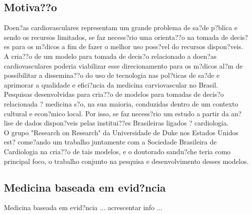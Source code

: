 \documentclass{article}
\begin{document}
\subsection{ \label{subsec:motivacao} Motiva??o}
Doen?as cardiovasculares representam um grande problema de sa?de p?blica e sendo os recursos limitados, se faz necess?rio uma orienta??o na tomada de decis?es para os m?dicos a fim de fazer o melhor uso poss?vel do recursos dispon?veis.\\ 
A cria??o de um modelo para tomada de decis?o relacionado a doen?as cardiovasculares poderia viabilizar esse direcionamento para os m?dicos al?m de possibilitar a dissemina??o do uso de tecnologia nas pol?ticas de sa?de e aprimorar a qualidade e efici?ncia da medicina carviovascular no Brasil.\\
Pesquisas desenvolvidas para cria??o de modelos para tomadas de decis?o relacionada ? medicina s?o, na sua maioria, conduzidas dentro de um contexto cultural e econ?mico local. Por isso, se faz necess?rio um estudo a partir da an?lise de dados dispon?veis pelas institui??es Brasileiras ligados ? cardiologia.\\
O grupo "Research on Research" da Universidade de Duke nos Estados Unidos est? come?ando um trabalho juntamente com a Sociedade Brasileira de Cardiologia na cria??o de tais modelos, e o doutorado sandu?che teria como principal foco, o trabalho conjunto na pesquisa e desenvolvimento desses modelos.
\subsection{ \label{subsec:evidencemed} Medicina baseada em evid?ncia}
Medicina baseada em evid?ncia {\color{red} ... acrescentar info ...}
\end{document}
